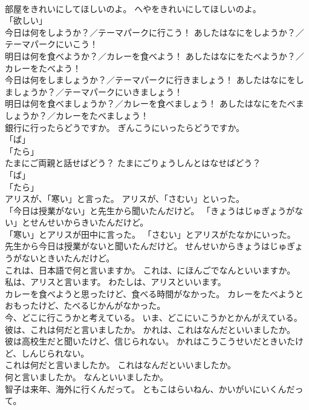 \documentclass[8pt]{extreport}
\begin{document}
\begin{CJK}{UTF8}{min}
\\	部屋をきれいにしてほしいのよ。	へやをきれいにしてほしいのよ。	
\\	「欲しい」	
\\	今日は何をしようか？／テーマパークに行こう！	あしたはなにをしようか？／テーマパークにいこう！	
\\	明日は何を食べようか？／カレーを食べよう！	あしたはなにをたべようか？／カレーをたべよう！	
\\	今日は何をしましょうか？／テーマパークに行きましょう！	あしたはなにをしましょうか？／テーマパークにいきましょう！	
\\	明日は何を食べましょうか？／カレーを食べましょう！	あしたはなにをたべましょうか？／カレーをたべましょう！	
\\	銀行に行ったらどうですか。	ぎんこうにいったらどうですか。	
\\	「ば」 
\\	「たら」 
\\	たまにご両親と話せばどう？	たまにごりょうしんとはなせばどう？	
\\	「ば」 
\\	「たら」 
\\	アリスが、「寒い」と言った。	アリスが、「さむい」といった。	
\\	「今日は授業がない」と先生から聞いたんだけど。	「きょうはじゅぎょうがない」とせんせいからきいたんだけど。	
\\	「寒い」とアリスが田中に言った。	「さむい」とアリスがたなかにいった。	
\\	先生から今日は授業がないと聞いたんだけど。	せんせいからきょうはじゅぎょうがないときいたんだけど。	
\\	これは、日本語で何と言いますか。	これは、にほんごでなんといいますか。	
\\	私は、アリスと言います。	わたしは、アリスといいます。	
\\	カレーを食べようと思ったけど、食べる時間がなかった。	カレーをたべようとおもったけど、たべるじかんがなかった。	
\\	今、どこに行こうかと考えている。	いま、どこにいこうかとかんがえている。	
\\	彼は、これは何だと言いましたか。	かれは、これはなんだといいましたか。	
\\	彼は高校生だと聞いたけど、信じられない。	かれはこうこうせいだときいたけど、しんじられない。	
\\	これは何だと言いましたか。	これはなんだといいましたか。	
\\	何と言いましたか。	なんといいましたか。	
\\	智子は来年、海外に行くんだって。	ともこはらいねん、かいがいにいくんだって。	

\end{CJK}
\end{document}
